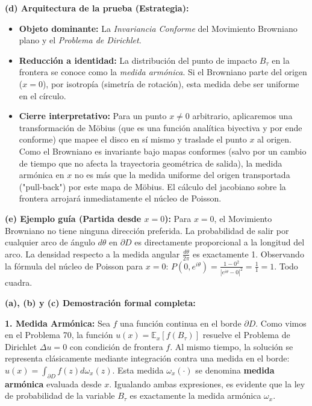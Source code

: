 \documentclass[11pt, letterpaper]{article}
\begin{document}
\vspace{5mm}

\begin{solucion}
    \textbf{(d) Arquitectura de la prueba (Estrategia):}
    \begin{itemize}
        \item[(i)] \textbf{Objeto dominante:} La \textit{Invariancia Conforme} del Movimiento Browniano plano y el \textit{Problema de Dirichlet}.
        \item[(ii)] \textbf{Reducción a identidad:} La distribución del punto de impacto $B_\tau$ en la frontera se conoce como la \textit{medida armónica}. Si el Browniano parte del origen ($x=0$), por isotropía (simetría de rotación), esta medida debe ser uniforme en el círculo.
        \item[(iii)] \textbf{Cierre interpretativo:} Para un punto $x \neq 0$ arbitrario, aplicaremos una transformación de Möbius (que es una función analítica biyectiva y por ende conforme) que mapee el disco en sí mismo y traslade el punto $x$ al origen. Como el Browniano es invariante bajo mapas conformes (salvo por un cambio de tiempo que no afecta la trayectoria geométrica de salida), la medida armónica en $x$ no es más que la medida uniforme del origen transportada ("pull-back") por este mapa de Möbius. El cálculo del jacobiano sobre la frontera arrojará inmediatamente el núcleo de Poisson.
    \end{itemize}

    \vspace{3mm}
    \textbf{(e) Ejemplo guía (Partida desde $x=0$):}
    Para $x=0$, el Movimiento Browniano no tiene ninguna dirección preferida. La probabilidad de salir por cualquier arco de ángulo $d\theta$ en $\partial D$ es directamente proporcional a la longitud del arco. La densidad respecto a la medida angular $\frac{d\theta}{2\pi}$ es exactamente 1. Observando la fórmula del núcleo de Poisson para $x=0$: $P(0, e^{i\theta}) = \frac{1 - 0^2}{|e^{i\theta} - 0|^2} = \frac{1}{1} = 1$. Todo cuadra.

    \textbf{(a), (b) y (c) Demostración formal completa:}

    \textbf{1. Medida Armónica:}
    Sea $f$ una función continua en el borde $\partial D$. Como vimos en el Problema 70, la función $u(x) = \mathbb{E}_x[f(B_\tau)]$ resuelve el Problema de Dirichlet $\Delta u = 0$ con condición de frontera $f$. 
    Al mismo tiempo, la solución se representa clásicamente mediante integración contra una medida en el borde: $u(x) = \int_{\partial D} f(z) d\omega_x(z)$.
    Esta medida $\omega_x(\cdot)$ se denomina \textbf{medida armónica} evaluada desde $x$. Igualando ambas expresiones, es evidente que la ley de probabilidad de la variable $B_\tau$ es exactamente la medida armónica $\omega_x$.


\end{solucion}
\end{document}
